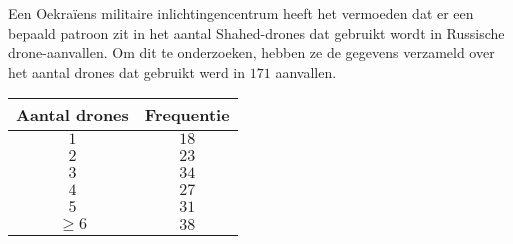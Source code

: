 \begin{question}{20}{
    Een Oekraïens militaire inlichtingencentrum heeft het vermoeden dat er een bepaald patroon zit in het aantal Shahed-drones dat gebruikt wordt in Russische drone-aanvallen.
    Om dit te onderzoeken, hebben ze de gegevens verzameld over het aantal drones dat gebruikt werd in $171$ aanvallen.
     
    \begin{center}
        \renewcommand{\arraystretch}{1.25}
        \begin{tabular}{cc}
            \toprule
                \textbf{Aantal drones} & \textbf{Frequentie} \\
            \midrule
                $1$ & $18$ \\
                $2$ & $23$ \\
                $3$ & $34$ \\
                $4$ & $27$ \\
                $5$ & $31$ \\
                $\geq 6$ & $38$ \\
            \bottomrule
        \end{tabular}
    \end{center}

}

\end{question}
